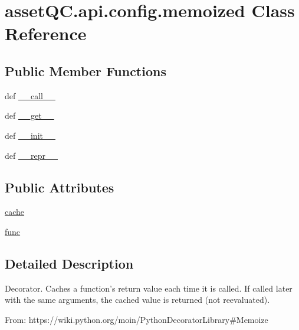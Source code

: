 \hypertarget{classassetQC_1_1api_1_1config_1_1memoized}{\section{asset\-Q\-C.\-api.\-config.\-memoized \-Class \-Reference}
\label{d5/d8c/classassetQC_1_1api_1_1config_1_1memoized}
}
\subsection*{\-Public \-Member \-Functions}
\begin{DoxyCompactItemize}
\item 
def \hyperlink{classassetQC_1_1api_1_1config_1_1memoized_a5378b91030d5ecb074ffc6c5680d06a3}{\-\_\-\-\_\-call\-\_\-\-\_\-}
\item 
def \hyperlink{classassetQC_1_1api_1_1config_1_1memoized_a76a5837c747b9c8fa4bb0105a3db14a1}{\-\_\-\-\_\-get\-\_\-\-\_\-}
\item 
def \hyperlink{classassetQC_1_1api_1_1config_1_1memoized_a934a4d0c21bc46073d7469ac6ce0da92}{\-\_\-\-\_\-init\-\_\-\-\_\-}
\item 
def \hyperlink{classassetQC_1_1api_1_1config_1_1memoized_a6a2e6a153c43b8ece4298235557842c6}{\-\_\-\-\_\-repr\-\_\-\-\_\-}
\end{DoxyCompactItemize}
\subsection*{\-Public \-Attributes}
\begin{DoxyCompactItemize}
\item 
\hyperlink{classassetQC_1_1api_1_1config_1_1memoized_abb23d4f3922f3c01cd82a840125303fe}{cache}
\item 
\hyperlink{classassetQC_1_1api_1_1config_1_1memoized_a74a1dfd01f404dcdbcef5d4aba9a64cf}{func}
\end{DoxyCompactItemize}


\subsection{\-Detailed \-Description}
\begin{DoxyVerb}
Decorator. Caches a function's return value each time it is called.
If called later with the same arguments, the cached value is returned
(not reevaluated).

From:
https://wiki.python.org/moin/PythonDecoratorLibrary#Memoize
\end{DoxyVerb}
 

